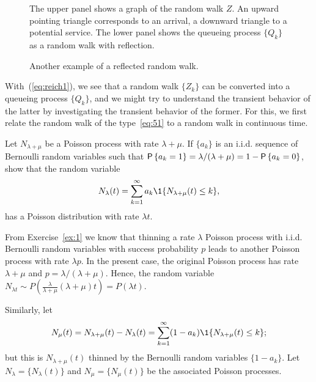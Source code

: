 \begin{figure}[ht]
  \centering

%
\caption{The upper panel shows a graph of the random walk $Z$. An
  upward pointing triangle corresponds to an arrival, a downward
  triangle to a potential service. The lower panel shows the queueing
  process $\{Q_k\}$ as a random walk with reflection.}
\label{fig:random_bernoulli}
\end{figure}

\begin{figure}[ht]
  \centering

\caption{Another example of a reflected random walk.}
\label{fig:random_walk}
\end{figure}


With~(\ref{eq:reich1}),  we see that a random walk $\{Z_k\}$ can be converted into a queueing
process $\{Q_k\}$, and we might try to understand the transient behavior of the latter by investigating the transient behavior of the former.  For this, we first relate the random walk of the type~\eqref{eq:51} to a random walk in continuous time. 

\begin{exercise}
  Let $N_{\lambda+\mu}$ be a Poisson process with rate $\lambda+\mu$. If $\{a_k\}$ is an i.i.d. sequence of Bernoulli random variables such that $\P{a_k=1} = \lambda/(\lambda+\mu)=1-\P{a_k=0}$, show that the random variable
  \begin{equation*}
    N_\lambda(t) = \sum_{k=1}^\infty a_k \1{N_{\lambda+\mu}(t) \leq k},
  \end{equation*}
has a Poisson distribution with rate $\lambda t$. 
\begin{solution}
  From Exercise~\ref{ex:1} we know that thinning  a rate $\lambda$ Poisson process  with i.i.d. Bernoulli random variables with success probability $p$  leads to another Poisson process with rate $\lambda p$. In the present case, the original Poisson process has rate $\lambda+\mu$ and $p=\lambda/(\lambda+\mu)$. Hence, the random variable $N_{\lambda t}\sim P\left(\frac\lambda{\lambda+\mu} (\lambda+\mu)t\right) = P(\lambda t)$.
\end{solution}
\end{exercise}

Similarly, let
\begin{equation*}
  N_\mu(t) = N_{\lambda+\mu}(t) - N_\lambda(t) = \sum_{k=1}^\infty (1-a_k) \1{N_{\lambda+\mu}(t) \leq k};
\end{equation*}
but this is $N_{\lambda+\mu}(t)$ thinned by the Bernoulli random variables $\{1-a_k\}$. Let  $N_\lambda = \{N_\lambda(t)\}$ and $N_\mu = \{N_\mu(t)\}$  be the associated Poisson processes. 

